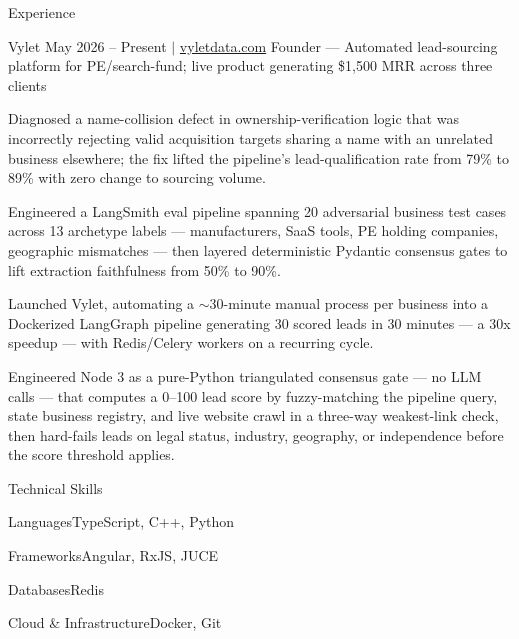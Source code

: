 \documentclass[
	11pt
]{../../../template}
\begin{document}
\begin{rSection}{E}{xperience}
		\begin{rSectionEntry}
			{Vylet}
			{May 2026 -- Present $\vert$ \href{https://vyletdata.com}{vyletdata.com}}
			{Founder --- Automated lead-sourcing platform for PE/search-fund; live product generating \$1,500 MRR across three clients}
			{}
			{}

			\item Diagnosed a name-collision defect in ownership-verification logic that was incorrectly rejecting valid acquisition targets sharing a name with an unrelated business elsewhere; the fix lifted the pipeline's lead-qualification rate from 79\% to 89\% with zero change to sourcing volume.
			\item Engineered a LangSmith eval pipeline spanning 20 adversarial business test cases across 13 archetype labels --- manufacturers, SaaS tools, PE holding companies, geographic mismatches --- then layered deterministic Pydantic consensus gates to lift extraction faithfulness from 50\% to 90\%.
			\item Launched Vylet, automating a $\sim$30-minute manual process per business into a Dockerized LangGraph pipeline generating 30 scored leads in 30 minutes --- a 30x speedup --- with Redis/Celery workers on a recurring cycle.
			\item Engineered Node 3 as a pure-Python triangulated consensus gate --- no LLM calls --- that computes a 0--100 lead score by fuzzy-matching the pipeline query, state business registry, and live website crawl in a three-way weakest-link check, then hard-fails leads on legal status, industry, geography, or independence before the score threshold applies.
		\end{rSectionEntry}
	\end{rSection}

	\begin{rSection}{T}{echnical Skills}
		\begin{rSet}{Languages}{TypeScript, C++, Python}
		\end{rSet}
		\begin{rSet}{Frameworks}{Angular, RxJS, JUCE}
		\end{rSet}
		\begin{rSet}{Databases}{Redis}
		\end{rSet}
		\begin{rSet}{Cloud \& Infrastructure}{Docker, Git}
		\end{rSet}
	\end{rSection}
\end{document}
